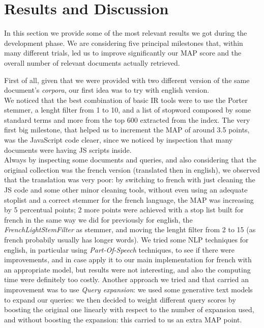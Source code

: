 \pagebreak
\section{Results and Discussion}
\label{sec:results}

In this section we provide some of the most relevant results we got during the development phase.
We are considering five principal milestones that, within many different trials, led us to improve significantly our MAP score and the overall number of relevant documents actually retrieved.



First of all, given that we were provided with two different version of the same document's \textit{corpora}, our first idea was to try with english version.\\ 
We noticed that the best combination of basic IR tools were to use the Porter stemmer, a lenght filter from 1 to 10, and a list of stopword composed by some standard terms and more from the top 600 extracted from the index.
The very first big milestone, that helped us to increment the MAP of around 3.5 points, was the JavaScript code cleaer, since we noticed by inspection that many documents were having JS scripts inside.\\
Always by inspecting some documents and queries, and also considering that the original collection was the french version (translated then in english), we observed that the translation was very poor: by switching to french
with just cleaning the JS code and some other minor cleaning tools, without even using an adequate stoplist and a correct stemmer for the french language, the MAP was increasing by 5 percentual points; 2 more points were achieved with
a stop list built for french in the same way we did for previously for english, the \textit{FrenchLightStemFilter} as stemmer, and moving the lenght filter from 2 to 15 (as french probabily usually has longer words).
We tried some NLP techniques for english, in particular using \textit{Part-Of-Speech} techniques, to see if there were improvements, and in case apply it to our main implementation for french with an appropriate model, but results 
were not interesting, and also the computing time were definitely too costly.
Another approach we tried and that carried an improvement was to use \textit{Query expansion}: we used some generative text models to expand our queries: we then decided to weight different query scores by boosting the original one linearly with respect to the number
of expansion used, and without boosting the expansion: this carried to us an extra MAP point.
